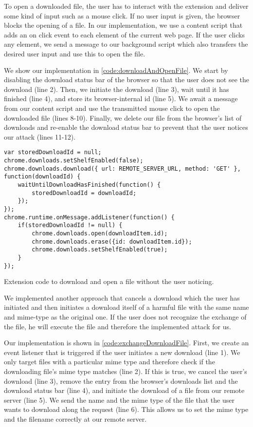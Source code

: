 	To open a downloaded file, the user has to interact with the extension and deliver some kind of input such as a mouse click. If no user input is given, the browser blocks the opening of a file. In our implementation, we use a content script that adds an on click event to each element of the current web page. If the user clicks any element, we send a message to our background script which also transfers the desired user input and use this to open the file.

	We show our implementation in \autoref{code:downloadAndOpenFile}. We start by disabling the download status bar of the browser so that the user does not see the download (line 2). Then, we initiate the download (line 3), wait until it has finished (line 4), and store its browser-internal id (line 5). We await a message from our content script and use the transmitted mouse click to open the downloaded file (lines 8-10). Finally, we delete our file from the browser's list of downloads and re-enable the download status bar to prevent that the user notices our attack (lines 11-12).
	
	\begin{code}
		\begin{lstlisting}
var storedDownloadId = null;
chrome.downloads.setShelfEnabled(false);
chrome.downloads.download({	url: REMOTE_SERVER_URL,	method: 'GET' }, function(downloadId) {
	waitUntilDownloadHasFinished(function() {
		storedDownloadId = downloadId;
	});
});		
chrome.runtime.onMessage.addListener(function() {
	if(storedDownloadId != null) {
		chrome.downloads.open(downloadItem.id);
		chrome.downloads.erase({id: downloadItem.id});
		chrome.downloads.setShelfEnabled(true);
	}
});
\end{lstlisting}
		\caption{Extension code to download and open a file without the user noticing.}
		\label{code:downloadAndOpenFile}
	\end{code}
	
	We implemented another approach that cancels a download which the user has initiated and then initiates a download itself of a harmful file with the same name and mime-type as the original one. If the user does not recognize the exchange of the file, he will execute the file and therefore the implemented attack for us.
	
	Our implementation is shown in \autoref{code:exchangeDownloadFile}. First, we create an event listener that is triggered if the user initiates a new download (line 1). We only target files with a particular mime type and therefore check if the downloading file's mime type matches (line 2). If this is true, we cancel the user's download (line 3), remove the entry from the browser's downloads list and the download status bar (line 4), and initiate the download of a file from our remote server (line 5). We send the name and the mime type of the file that the user wants to download along the request (line 6). This allows us to set the mime type and the filename correctly at our remote server.
	
